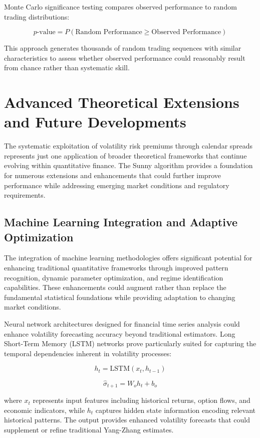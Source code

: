 \documentclass[
  american,
  11pt,
  11pt,
  letterpaper,
  onecolumn]{article}
\begin{document}
Monte Carlo significance testing compares observed performance to random
trading distributions:

\[p\text{-value} = P(\text{Random Performance} \geq \text{Observed Performance})\]

This approach generates thousands of random trading sequences with
similar characteristics to assess whether observed performance could
reasonably result from chance rather than systematic skill.

\section{Advanced Theoretical Extensions and Future
Developments}\label{advanced-theoretical-extensions-and-future-developments}

The systematic exploitation of volatility risk premiums through calendar
spreads represents just one application of broader theoretical
frameworks that continue evolving within quantitative finance. The Sunny
algorithm provides a foundation for numerous extensions and enhancements
that could further improve performance while addressing emerging market
conditions and regulatory requirements.

\subsection{Machine Learning Integration and Adaptive
Optimization}\label{machine-learning-integration-and-adaptive-optimization}

The integration of machine learning methodologies offers significant
potential for enhancing traditional quantitative frameworks through
improved pattern recognition, dynamic parameter optimization, and regime
identification capabilities. These enhancements could augment rather
than replace the fundamental statistical foundations while providing
adaptation to changing market conditions.

Neural network architectures designed for financial time series analysis
could enhance volatility forecasting accuracy beyond traditional
estimators. Long Short-Term Memory (LSTM) networks prove particularly
suited for capturing the temporal dependencies inherent in volatility
processes:

\[h_t = \text{LSTM}(x_t, h_{t-1})\]

\[\hat{\sigma}_{t+1} = W_o h_t + b_o\]

where \(x_t\) represents input features including historical returns,
option flows, and economic indicators, while \(h_t\) captures hidden
state information encoding relevant historical patterns. The output
provides enhanced volatility forecasts that could supplement or refine
traditional Yang-Zhang estimates.
\end{document}
